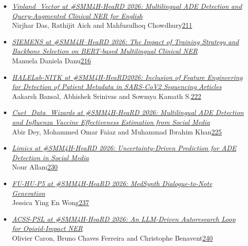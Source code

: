 \documentclass[11pt,oneside]{book}
\begin{document}
\begin{itemize}[leftmargin=*,label={}]
       \item \hyperlink{page.211}{\emph{Vinland\_Vector at \#SMM4H-HeaRD 2026: Multilingual ADE Detection and Query-Augmented Clinical NER for English}}\\ \hspace*{2em} Nirjhar Das, Rathijit Aich and Mahfuzulhoq Chowdhury\dotfill \hyperlink{page.211}{211}
       \item \hyperlink{page.216}{\emph{SIEMENS at \#SMM4H–HeaRD 2026: The Impact of Training Strategy and Backbone Selection on BERT-based Multilingual Clinical NER}}\\ \hspace*{2em} Manuela Daniela Danu\dotfill \hyperlink{page.216}{216}
       \item \hyperlink{page.222}{\emph{HALELab-NITK at \#SMM4H-HeaRD2026: Inclusion of Feature Engineering for Detection of Patient Metadata in SARS-CoV2 Sequencing Articles}}\\ \hspace*{2em} Aakarsh Bansal, Abhishek Srinivas and Sowmya Kamath S.\dotfill \hyperlink{page.222}{222}
       \item \hyperlink{page.225}{\emph{Cuet\_Data\_Wizards at \#SMM4H-HeaRD 2026: Multilingual ADE Detection and Influenza Vaccine Effectiveness Estimation from Social Media}}\\ \hspace*{2em} Abir Dey, Mohammed Omar Faiaz and Muhammad Ibrahim Khan\dotfill \hyperlink{page.225}{225}
       \item \hyperlink{page.230}{\emph{Limics at \#SMM4H-HeaRD 2026: Uncertainty-Driven Prediction for ADE Detection in Social Media}}\\ \hspace*{2em} Nour Allam\dotfill \hyperlink{page.230}{230}
       \item \hyperlink{page.237}{\emph{FU-HU-P5 at \#SMM4H-HeaRD 2026: MedSynth Dialogue-to-Note Generation}}\\ \hspace*{2em} Jessica Ying En Wong\dotfill \hyperlink{page.237}{237}
       \item \hyperlink{page.240}{\emph{ACSS-PSL at \#SMM4H-HeaRD 2026: An LLM-Driven Autoresearch Loop for Opioid-Impact NER}}\\ \hspace*{2em} Olivier Caron, Bruno Chaves Ferreira and Christophe Benavent\dotfill \hyperlink{page.240}{240}

\end{itemize}
\end{document}
